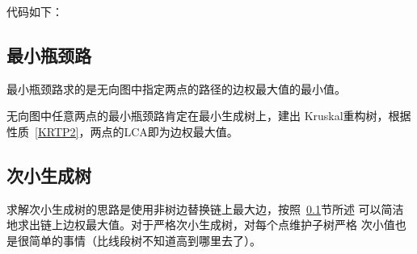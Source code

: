 代码如下：


\subsection{最小瓶颈路}\label{MBP}
最小瓶颈路求的是无向图中指定两点的路径的边权最大值的最小值。

无向图中任意两点的最小瓶颈路肯定在最小生成树上，建出
Kruskal重构树，根据性质~\ref{KRTP2}，两点的LCA即为边权最大值。

\subsection{次小生成树}
求解次小生成树的思路是使用非树边替换链上最大边，按照~\ref{MBP}节所述
可以简洁地求出链上边权最大值。对于严格次小生成树，对每个点维护子树严格
次小值也是很简单的事情（比线段树不知道高到哪里去了）。
